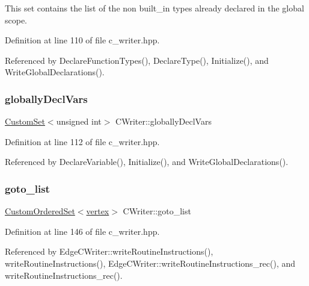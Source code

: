 This set contains the list of the non built\+\_\+in types already declared in the global scope. 



Definition at line 110 of file c\+\_\+writer.\+hpp.



Referenced by Declare\+Function\+Types(), Declare\+Type(), Initialize(), and Write\+Global\+Declarations().

\mbox{\label{classCWriter_a9fd0eb45bad6d32417b1802bcefe608b}} 
\subsubsection{\texorpdfstring{globally\+Decl\+Vars}{globallyDeclVars}}
{\footnotesize\ttfamily \hyperlink{custom__set_8hpp_a615bc2f42fc38a4bb1790d12c759e86f}{Custom\+Set}$<$unsigned int$>$ C\+Writer\+::globally\+Decl\+Vars\hspace{0.3cm}{\ttfamily [protected]}}



Definition at line 112 of file c\+\_\+writer.\+hpp.



Referenced by Declare\+Variable(), Initialize(), and Write\+Global\+Declarations().

\mbox{\label{classCWriter_a61696d39d3585dafd6a5cc73fa0192b7}} 
\subsubsection{\texorpdfstring{goto\+\_\+list}{goto\_list}}
{\footnotesize\ttfamily \hyperlink{classCustomOrderedSet}{Custom\+Ordered\+Set}$<$\hyperlink{graph_8hpp_abefdcf0544e601805af44eca032cca14}{vertex}$>$ C\+Writer\+::goto\+\_\+list\hspace{0.3cm}{\ttfamily [protected]}}



Definition at line 146 of file c\+\_\+writer.\+hpp.



Referenced by Edge\+C\+Writer\+::write\+Routine\+Instructions(), write\+Routine\+Instructions(), Edge\+C\+Writer\+::write\+Routine\+Instructions\+\_\+rec(), and write\+Routine\+Instructions\+\_\+rec().

